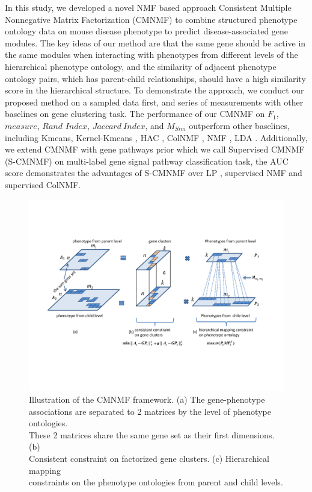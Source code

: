 \documentclass{bmcart}
\begin{document}
In this study, we developed a novel NMF based approach Consistent Multiple Nonnegative Matrix Factorization (CMNMF) to combine structured phenotype ontology data on mouse disease phenotype to predict disease-associated gene modules. The key ideas of our method are that the same gene should be active in the same modules when interacting with phenotypes from different levels of the hierarchical phenotype ontology, and the similarity of adjacent phenotype ontology pairs, which has parent-child relationships, should have a high similarity score in the hierarchical structure. To demonstrate the approach, we conduct our proposed method on a sampled data first, and series of measurements with other baselines on gene clustering task. The performance of our CMNMF on $F_1$, $measure$, $Rand$ $Index$, $Jaccard\ Index$, and $M_{Sim}$ outperform other baselines, including Kmeans, Kernel-Kmeans \cite{Dhillon2004}, HAC \cite{Ward1963}, ColNMF \cite{Singh2008}, NMF \cite{Lee1999}, LDA \cite{Blei2003}. Additionally, we extend CMNMF with gene pathways prior which we call Supervised CMNMF (S-CMNMF) on multi-label gene signal pathway classification task, the AUC score demonstrates the advantages of S-CMNMF over LP \cite{Raghavan2007}, supervised NMF and supervised ColNMF.
\begin{figure}[!t]
  \centering
  \begin{minipage}{.80\linewidth}
  \centering
    \includegraphics[width=\linewidth]{DrawPictures/module2.pdf}
  \end{minipage}
  \caption{Illustration of the CMNMF framework. (a) The gene-phenotype \\ associations are separated to 2 matrices by the level of phenotype ontologies. \\These 2 matrices share the same gene set as their first dimensions. (b)\\ Consistent constraint on factorized gene clusters. (c) Hierarchical mapping \\ constraints on the phenotype ontologies from parent and child levels.}
  \label{fig:model}
\end{figure}
\end{document}
